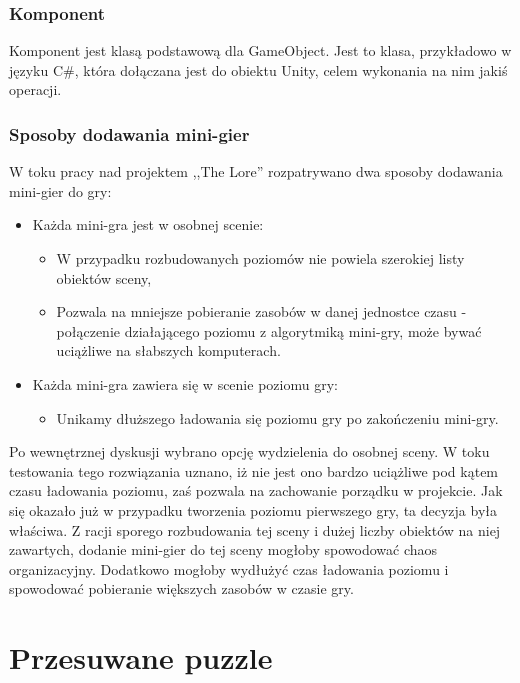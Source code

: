 \documentclass[oneside,polski,logo]{amuthesis}
\begin{document}
\subsubsection{Komponent}
\label{sec:komponent}
\par Komponent jest klasą podstawową dla GameObject. Jest to klasa, przykładowo w języku C\#, która dołączana jest do obiektu Unity, celem wykonania na nim jakiś operacji. \cite{komponent}
\subsubsection{Sposoby dodawania mini-gier}
\par W toku pracy nad projektem ,,The Lore'' rozpatrywano dwa sposoby dodawania mini-gier do gry:
\begin{itemize}
	\item{Każda mini-gra jest w osobnej scenie:}
	\begin{itemize}
		\item W przypadku rozbudowanych poziomów nie powiela szerokiej listy obiektów sceny,
		\item Pozwala na mniejsze pobieranie zasobów w danej jednostce czasu - połączenie działającego poziomu z algorytmiką mini-gry, może bywać uciążliwe na słabszych komputerach.
	\end{itemize}
	\item{Każda mini-gra zawiera się w scenie poziomu gry:}
		\begin{itemize}
		\item Unikamy dłuższego ładowania się poziomu gry po zakończeniu mini-gry.
	\end{itemize}
\end{itemize}

Po wewnętrznej dyskusji wybrano opcję wydzielenia do osobnej sceny. W toku testowania tego rozwiązania uznano, iż nie jest ono bardzo uciążliwe pod kątem czasu ładowania poziomu, zaś pozwala na zachowanie porządku w projekcie. Jak się okazało już w przypadku tworzenia poziomu pierwszego gry, ta decyzja była właściwa. Z racji sporego rozbudowania tej sceny i dużej liczby obiektów na niej zawartych, dodanie mini-gier do tej sceny mogłoby spowodować chaos organizacyjny. Dodatkowo mogłoby wydłużyć czas ładowania poziomu i spowodować pobieranie większych zasobów w czasie gry.

\section{Przesuwane puzzle}
\end{document}
